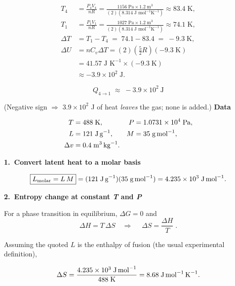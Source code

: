 \documentclass[12pt]{article}
\theoremstyle{definition} %
\theoremstyle{plain} %
\begin{document}
\[
\begin{aligned}
T_4 &= \frac{P_4 V_4}{nR}
     = \frac{1156\;\text{Pa}\times 1.2\;\text{m}^3}{(2)(8.314\;\text{J mol}^{-1}\text{K}^{-1})}
     \approx 83.4\;\text{K},\\[6pt]
T_1 &= \frac{P_1 V_1}{nR}
     = \frac{1027\;\text{Pa}\times 1.2\;\text{m}^3}{(2)(8.314\;\text{J mol}^{-1}\text{K}^{-1})}
     \approx 74.1\;\text{K},\\[6pt]
\Delta T &= T_1 - T_4 \;=\; 74.1 - 83.4 \;=\; -9.3\;\text{K},\\[6pt]
\Delta U &= nC_v\Delta T
         = (2)\!\left(\tfrac{5}{2}R\right)(-9.3\;\text{K}) \\[4pt]
         &= 41.57\;\text{J K}^{-1}\times(-9.3\;\text{K}) \\[4pt]
         &\approx -3.9\times10^{2}\;\text{J}.
\end{aligned}
\]

\[
\boxed{Q_{4\rightarrow1} \;\approx\; -3.9 \times 10^{2}\ \text{J}}
\]

(Negative sign $\Rightarrow$ $3.9\times10^{2}$ J of heat \emph{leaves} the gas; none is added.)
\textbf{Data}

\[
\begin{aligned}
T        &= 488\;\text{K}, &
P        &= 1.0731\times10^{4}\;\text{Pa},\\
L        &= 121\;\text{J\,g}^{-1}, &
M        &= 35\;\text{g\,mol}^{-1},\\
\Delta v &= 0.4\;\text{m}^{3}\,\text{kg}^{-1}.
\end{aligned}
\]

\bigskip
\textbf{1.\ Convert latent heat to a molar basis}

\[
\boxed{L_{\text{molar}} = L\,M}
      = (121\;\text{J\,g}^{-1})(35\;\text{g\,mol}^{-1})
      = 4.235\times10^{3}\;\text{J\,mol}^{-1}.
\]

\bigskip
\textbf{2.\ Entropy change at constant \emph{T} and \emph{P}}

For a phase transition in equilibrium, \( \Delta G = 0 \) and
\[
\Delta H = T\,\Delta S
\quad\Longrightarrow\quad
\boxed{\;\Delta S = \dfrac{\Delta H}{T}\;}.
\]

Assuming the quoted \(L\) is the enthalpy of fusion (the usual experimental definition),

\[
\Delta S
  = \frac{4.235\times10^{3}\;\text{J\,mol}^{-1}}
         {488\;\text{K}}
  = 8.68\;\text{J\,mol}^{-1}\,\text{K}^{-1}.
\]
\end{document}
